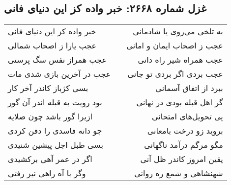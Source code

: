 \begin{center}
\section*{غزل شماره ۲۶۶۸: خبر واده کز این دنیای فانی}
\label{sec:2668}
\begin{longtable}{l p{0.5cm} r}
خبر واده کز این دنیای فانی
&&
به تلخی می‌روی یا شادمانی
\\
عجب یارا ز اصحاب شمالی
&&
عجب ز اصحاب ایمان و امانی
\\
عجب همراز نفس سگ پرستی
&&
عجب همراه شیر راه دانی
\\
عجب در آخرین بازی شدی مات
&&
عجب بردی اگر بردی تو جانی
\\
بسی کژباز کاندر آخر کار
&&
ببرد از اتفاق آسمانی
\\
بود رویت به قبله اندر آن گور
&&
گر اهل قبله بودی در نهانی
\\
ازیرا گور باشد چون صلایه
&&
پی تحویل‌های امتحانی
\\
چو دانه فاسدی را دفن کردی
&&
بروید زو درخت بامعانی
\\
بسی طبل اجل پیشین شنیدی
&&
مگو مرگم درآمد ناگهانی
\\
اگر در عمر آهی برکشیدی
&&
یقین امروز کاندر ظل آنی
\\
وگر با آه راهی نیز رفتی
&&
شهنشاهی و شمع ره روانی
\\
\end{longtable}
\end{center}
